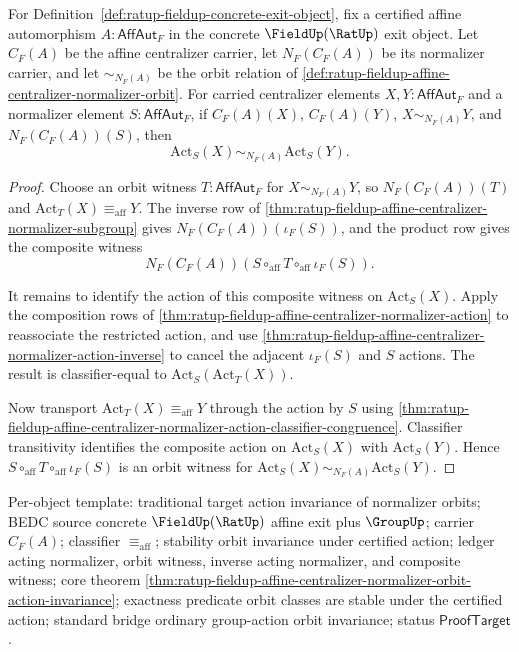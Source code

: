 \begin{theorem}
\label{thm:ratup-fieldup-affine-centralizer-normalizer-orbit-action-invariance}
For Definition~\ref{def:ratup-fieldup-concrete-exit-object}, fix a certified
affine automorphism $A:\mathsf{AffAut}_F$ in the concrete $\FieldUp(\RatUp)$
exit object. Let $C_F(A)$ be the affine centralizer carrier, let
$N_F(C_F(A))$ be its normalizer carrier, and let $\sim_{N_F(A)}$ be the orbit
relation of
\autoref{def:ratup-fieldup-affine-centralizer-normalizer-orbit}. For carried
centralizer elements $X,Y:\mathsf{AffAut}_F$ and a normalizer element
$S:\mathsf{AffAut}_F$, if $C_F(A)(X)$, $C_F(A)(Y)$,
$X\sim_{N_F(A)}Y$, and $N_F(C_F(A))(S)$, then
$$
\mathrm{Act}_S(X)\sim_{N_F(A)}\mathrm{Act}_S(Y).
$$
\end{theorem}
\begin{proof}
Choose an orbit witness $T:\mathsf{AffAut}_F$ for $X\sim_{N_F(A)}Y$, so
$N_F(C_F(A))(T)$ and
$\mathrm{Act}_T(X)\equiv_{\mathrm{aff}}Y$. The inverse row of
\autoref{thm:ratup-fieldup-affine-centralizer-normalizer-subgroup} gives
$N_F(C_F(A))(\iota_F(S))$, and the product row gives the composite witness
$$
N_F(C_F(A))(S\circ_{\mathrm{aff}}T\circ_{\mathrm{aff}}\iota_F(S)).
$$

It remains to identify the action of this composite witness on
$\mathrm{Act}_S(X)$. Apply the composition rows of
\autoref{thm:ratup-fieldup-affine-centralizer-normalizer-action} to reassociate
the restricted action, and use
\autoref{thm:ratup-fieldup-affine-centralizer-normalizer-action-inverse} to
cancel the adjacent $\iota_F(S)$ and $S$ actions. The result is classifier-equal
to $\mathrm{Act}_S(\mathrm{Act}_T(X))$.

Now transport
$\mathrm{Act}_T(X)\equiv_{\mathrm{aff}}Y$ through the action by $S$ using
\autoref{thm:ratup-fieldup-affine-centralizer-normalizer-action-classifier-congruence}.
Classifier transitivity identifies the composite action on
$\mathrm{Act}_S(X)$ with $\mathrm{Act}_S(Y)$. Hence
$S\circ_{\mathrm{aff}}T\circ_{\mathrm{aff}}\iota_F(S)$ is an orbit witness for
$\mathrm{Act}_S(X)\sim_{N_F(A)}\mathrm{Act}_S(Y)$.
\end{proof}

Per-object template: traditional target action invariance of normalizer
orbits; BEDC source concrete $\FieldUp(\RatUp)$ affine exit plus $\GroupUp$;
carrier $C_F(A)$; classifier $\equiv_{\mathrm{aff}}$; stability orbit
invariance under certified action; ledger acting normalizer, orbit witness,
inverse acting normalizer, and composite witness; core theorem
\autoref{thm:ratup-fieldup-affine-centralizer-normalizer-orbit-action-invariance};
exactness predicate orbit classes are stable under the certified action;
standard bridge ordinary group-action orbit invariance; status
$\mathsf{ProofTarget}$.

